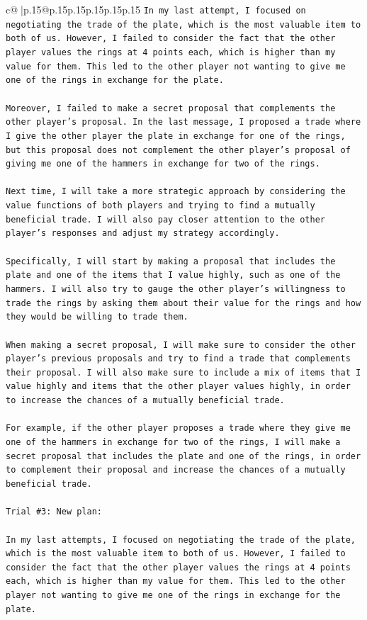 \documentclass{article}
\begin{document}
{\begin{supertabular}{c@{$\;$}|p{.15\linewidth}@{}p{.15\linewidth}p{.15\linewidth}p{.15\linewidth}p{.15\linewidth}p{.15\linewidth}}
{{{\texttt{In my last attempt, I focused on negotiating the trade of the plate, which is the most valuable item to both of us. However, I failed to consider the fact that the other player values the rings at 4 points each, which is higher than my value for them. This led to the other player not wanting to give me one of the rings in exchange for the plate.} \\
\\ 
\texttt{Moreover, I failed to make a secret proposal that complements the other player's proposal. In the last message, I proposed a trade where I give the other player the plate in exchange for one of the rings, but this proposal does not complement the other player's proposal of giving me one of the hammers in exchange for two of the rings.} \\
\\ 
\texttt{Next time, I will take a more strategic approach by considering the value functions of both players and trying to find a mutually beneficial trade. I will also pay closer attention to the other player's responses and adjust my strategy accordingly.} \\
\\ 
\texttt{Specifically, I will start by making a proposal that includes the plate and one of the items that I value highly, such as one of the hammers. I will also try to gauge the other player's willingness to trade the rings by asking them about their value for the rings and how they would be willing to trade them.} \\
\\ 
\texttt{When making a secret proposal, I will make sure to consider the other player's previous proposals and try to find a trade that complements their proposal. I will also make sure to include a mix of items that I value highly and items that the other player values highly, in order to increase the chances of a mutually beneficial trade.} \\
\\ 
\texttt{For example, if the other player proposes a trade where they give me one of the hammers in exchange for two of the rings, I will make a secret proposal that includes the plate and one of the rings, in order to complement their proposal and increase the chances of a mutually beneficial trade.} \\
\\ 
\texttt{Trial \#3: New plan: } \\
\\ 
\texttt{In my last attempts, I focused on negotiating the trade of the plate, which is the most valuable item to both of us. However, I failed to consider the fact that the other player values the rings at 4 points each, which is higher than my value for them. This led to the other player not wanting to give me one of the rings in exchange for the plate.} \\
}}}
\end{supertabular}}
\end{document}
